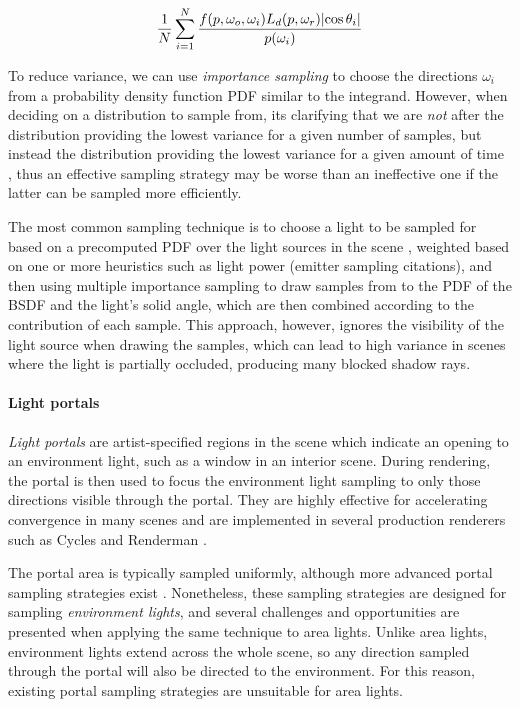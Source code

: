 \begin{equation}
  \frac{1}{N} \sum_{i=1}^N \frac{f(p, \omega_o, \omega_i) L_d(p, \omega_r) \lvert\cos\theta_i\rvert}{p(\omega_i)}
\end{equation}

To reduce variance, we can use \emph{importance sampling} to choose the directions $\omega_i$ from a probability density function PDF similar to the integrand. However, when deciding on a distribution to sample from, its clarifying that we are \emph{not} after the distribution providing the lowest variance for a given number of samples, but instead the distribution providing the lowest variance for a given amount of time \cite{shirleyMonteCarloTechniques1996}, thus an effective sampling strategy may be worse than an ineffective one if the latter can be sampled more efficiently.

The most common sampling technique is to choose a light to be sampled for based on a precomputed PDF over the light sources in the scene \cite{shirleyMonteCarloTechniques1996}, weighted based on one or more heuristics such as light power (emitter sampling citations), and then using multiple importance sampling \cite{veachROBUSTMONTECARLO} to draw samples from to the PDF of the BSDF and the light's solid angle, which are then combined according to the contribution of each sample. This approach, however, ignores the visibility of the light source when drawing the samples, which can lead to high variance in scenes where the light is partially occluded, producing many blocked shadow rays.

\paragraph{Light portals}
\emph{Light portals} are artist-specified regions in the scene which indicate an opening to an environment light, such as a window in an interior scene. During rendering, the portal is then used to focus the environment light sampling to only those directions visible through the portal. They are highly effective for accelerating convergence in many scenes and are implemented in several production renderers such as Cycles \cite{LightSettingsBlender} and Renderman \cite{PxrPortalLight}.

The portal area is typically sampled uniformly, although more advanced portal sampling strategies exist \cite{ogakiGeneralizedLightPortals2020}\cite{bitterliPortalMaskedEnvironment2015}. Nonetheless, these sampling strategies are designed for sampling \emph{environment lights}, and several challenges and opportunities are presented when applying the same technique to area lights. Unlike area lights, environment lights extend across the whole scene, so any direction sampled through the portal will also be directed to the environment. For this reason, existing portal sampling strategies are unsuitable for area lights.